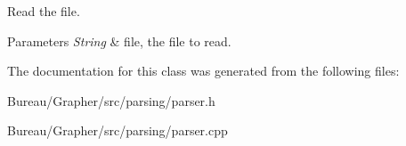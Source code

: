 \-Read the file. 


\begin{DoxyParams}{\-Parameters}
{\em \-String} & file, the file to read. \\
\hline
\end{DoxyParams}


\-The documentation for this class was generated from the following files\-:\begin{DoxyCompactItemize}
\item 
\-Bureau/\-Grapher/src/parsing/parser.\-h\item 
\-Bureau/\-Grapher/src/parsing/parser.\-cpp\end{DoxyCompactItemize}
